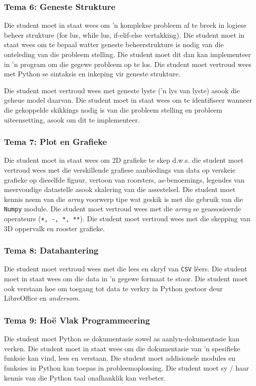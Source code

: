 \subsubsection {Tema 6: Geneste Strukture} 
	             Die student moet in staat wees om 'n komplekse probleem af te breek in logiese beheer strukture (for lus, while lus, if-elif-else vertakking). Die 
             student moet in staat wees om te bepaal watter geneste beheerstrukture is nodig 
             van die onteleding van die probleem stelling. Die student moet dit dan kan implementeer
	   in 'n program om die gegewe 
             probleem op te los. Die student moet vertroud wees met Python se  
             sintaksis en inkeping vir geneste strukture.

	Die student moet vertroud wees met geneste lyste ('n lys van lyste) asook die geheue model daarvan.	
	 Die student moet in staat wees om te identifiseer 
             wanneer die gekoppelde skikkings nodig is van die probleem stelling en
             probleem uiteensetting, asook om dit te implementeer.
                
\subsubsection {Tema 7: Plot en Grafieke} 
         Die student moet in staat wees om 2D grafieke te skep d.w.s. die student 
         moet vertroud wees met die verskillende grafiese aanbiedings van data op verskeie
	grafieke op dieselfde figuur, vertoon van roorsters, as-benoemings, legendes van meervoudige
	datastelle asook skalering van die assestelsel. Die student moet kennis neem van die \textit{array}
	voorwerp tipe wat geskik is met die gebruik van die \texttt {Numpy} module. Die student moet
	vertroud wees met die \textit{array} se geassosieerde operateurs (\texttt {+, -, *, **}). Die student
	moet vertroud wees met die skepping van 3D oppervalk en rooster grafieke.

\subsubsection {Tema 8: Datahantering} 
         Die student moet vertroud wees met die lees en skryf
         van \texttt {CSV} l\^eers. 
         Die student moet in staat wees om die data in 'n gegewe formaat te stoor.
	Die student moet ook verstaan ​​hoe om toegang tot data te verkry in Python
         gestoor deur LibreOffice en \textit {andersom}.

\subsubsection {Tema 9: Ho\"e Vlak Programmeering} 
                Die student moet Python se dokumentasie 
                sowel as aanlyn-dokumentasie kan verken. Die student moet in staat wees om die dokumentasie van 'n spesifieke funksie kan vind, lees en verstaan. Die student moet addisionele modules en funksies in Python kan
                toepas in probleemoplossing. Die student moet sy / haar kennis van die Python taal 	
    onafhanklik kan verbeter.

